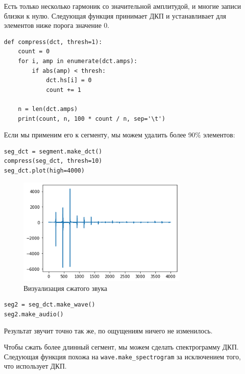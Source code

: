 \documentclass[a4paper,12pt]{report}
\begin{document}
Есть только несколько гармоник со значительной амплитудой, и многие записи близки к нулю. Следующая функция принимает ДКП и устанавливает для элементов ниже порога значение 0.

\begin{lstlisting}[caption=Функция \texttt{compress}]
def compress(dct, thresh=1):
    count = 0
    for i, amp in enumerate(dct.amps):
        if abs(amp) < thresh:
            dct.hs[i] = 0
            count += 1
            
    n = len(dct.amps)
    print(count, n, 100 * count / n, sep='\t')
\end{lstlisting}

Если мы применим его к сегменту, мы можем удалить более 90\% элементов:

\begin{lstlisting}[caption=Сжатие звука]
seg_dct = segment.make_dct()
compress(seg_dct, thresh=10)
seg_dct.plot(high=4000)
\end{lstlisting}

\begin{figure}[H]
        \centering
        \includegraphics[width=0.75\textwidth]{lab6_fig2_2.png}
        \caption{Визуализация сжатого звука}
        \label{fig:lab6_fig2_2}
\end{figure}

\begin{lstlisting}[caption=Воспроизведение сжатого звука]
seg2 = seg_dct.make_wave()
seg2.make_audio()
\end{lstlisting}

Результат звучит точно так же, по ощущениям ничего не изменилось.

Чтобы сжать более длинный сегмент, мы можем сделать спектрограмму ДКП. Следующая функция похожа на \texttt{wave.make\_spectrogram} за исключением того, что использует ДКП.
\end{document}
